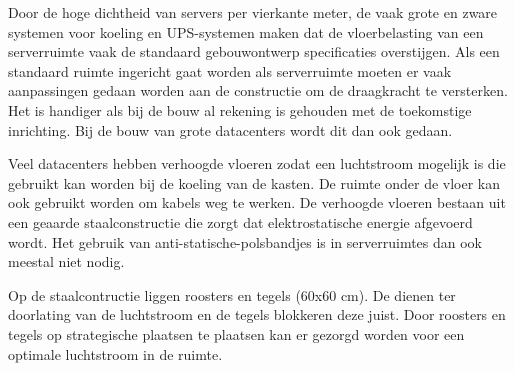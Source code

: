 Door de hoge dichtheid van servers per vierkante meter, de vaak grote en zware systemen voor koeling en UPS-systemen maken dat de vloerbelasting van een serverruimte vaak de standaard gebouwontwerp specificaties overstijgen. Als een standaard ruimte ingericht gaat worden als serverruimte moeten er vaak aanpassingen gedaan worden aan de constructie om de draagkracht te versterken. Het is handiger als bij de bouw al rekening is gehouden met de toekomstige inrichting. Bij de bouw van grote datacenters wordt dit dan ook gedaan.

Veel datacenters hebben verhoogde vloeren zodat een luchtstroom mogelijk is die gebruikt kan worden bij de koeling van de kasten. De ruimte onder de vloer kan ook gebruikt worden om kabels weg te werken. De verhoogde vloeren bestaan uit een geaarde staalconstructie die zorgt dat elektrostatische energie afgevoerd wordt. Het gebruik van anti-statische-polsbandjes is in serverruimtes dan ook meestal niet nodig.

Op de staalcontructie liggen roosters en tegels (60x60 cm). De dienen ter doorlating van de luchtstroom en de tegels blokkeren deze juist. Door roosters en tegels op strategische plaatsen te plaatsen kan er gezorgd worden voor een optimale luchtstroom in de ruimte.
